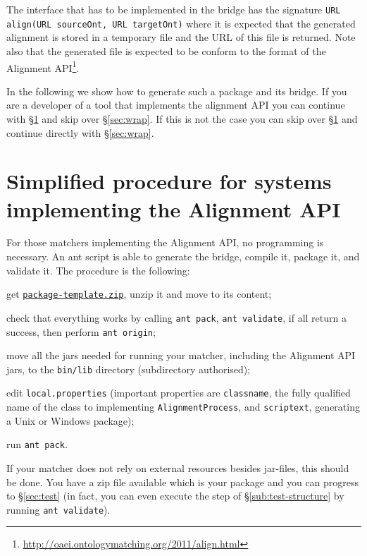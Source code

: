 \documentclass{article}
\def\file#1{\textcolor{grayy}{\texttt{#1}}}
\def\tool#1{\textsl{#1}}
\newcommand\smtt[1]{\texttt{\small #1}}
\begin{document}
The interface that has to be implemented in the bridge has the signature \verb|URL align(URL sourceOnt, URL targetOnt)| where it is expected that the generated alignment is stored in a temporary file and the URL of this file is returned. Note also that the generated file is expected to be conform to the format of the Alignment API\footnote{\url{http://oaei.ontologymatching.org/2011/align.html}}.

In the following we show how to generate such a package and its bridge. If you are a developer of a tool that implements the alignment API you can continue with \S\ref{sec:aapi} and skip over \S\ref{sec:wrap}. If this is not the case you can skip over \S\ref{sec:aapi} and continue directly with \S\ref{sec:wrap}.

\section{Simplified procedure for systems implementing the Alignment API}
\label{sec:aapi}

For those matchers implementing the Alignment API, no programming is necessary. An ant script is able to generate the bridge, compile it, package it, and validate it. The procedure is the following:
\begin{enumerate*}
\item get \href{http://oaei.ontologymatching.org/2011/tutorial/package-template.zip}{\nolinkurl{package-template.zip}}, unzip it and move to its content;
\item check that everything works by calling \smtt{ant pack}, \smtt{ant validate}, if all return a success, then perform \smtt{ant origin};
\item move all the jars needed for running your matcher, including the Alignment API jars, to the \file{bin/lib} directory (subdirectory authorised);
\item edit \smtt{local.properties} (important properties are \verb|classname|, the fully qualified name of the class to implementing \verb|AlignmentProcess|, and \verb|scriptext|, generating a Unix or Windows package);
\item run \verb|ant pack|.
\end{enumerate*}

If your matcher does not rely on external resources besides jar-files, this should be done. You have a zip file available which is your package and you can progress to \S\ref{sec:test} (in fact, you can even execute the step of \S\ref{sub:test-structure} by running \verb|ant validate|).
\end{document}
